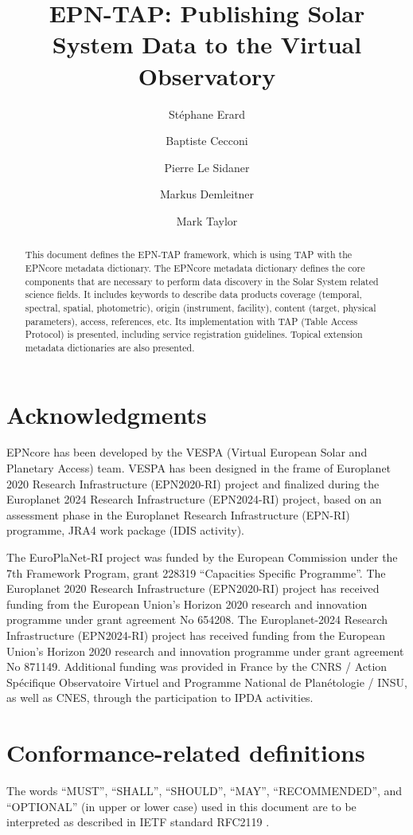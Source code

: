 \documentclass[11pt,a4paper]{ivoa}
\title{EPN-TAP: Publishing Solar System Data to the Virtual Observatory}
\author{St\'ephane Erard}
\author{Baptiste Cecconi}
\author{Pierre Le Sidaner}
\author{Markus Demleitner}
\author{Mark Taylor}
\begin{document}
\begin{abstract}
This document defines the EPN-TAP framework, which is using TAP with
the EPNcore metadata dictionary. The EPNcore metadata dictionary defines
the core components that are necessary to perform data discovery in the
Solar System related science fields. It includes keywords to describe
data products coverage (temporal, spectral, spatial, photometric), origin
(instrument, facility), content (target, physical parameters), access,
references, etc. Its implementation with TAP (Table Access Protocol) is
presented, including service registration guidelines. Topical extension
metadata dictionaries are also presented.
\end{abstract}


\section*{Acknowledgments}

EPNcore has been developed by the VESPA (Virtual European Solar
and Planetary Access) team.  VESPA has been designed in the frame of
Europlanet 2020 Research Infrastructure (EPN2020-RI) project and finalized
during the Europlanet 2024 Research Infrastructure (EPN2024-RI) project,
based on an assessment phase in the Europlanet Research Infrastructure
(EPN-RI) programme, JRA4 work package (IDIS activity).

The EuroPlaNet-RI project was funded by the European Commission under the
7th Framework Program, grant 228319 ``Capacities Specific Programme''.
The Europlanet 2020 Research Infrastructure (EPN2020-RI) project has
received funding from the European Union's Horizon 2020 research and
innovation programme under grant agreement No 654208.  The Europlanet-2024
Research Infrastructure (EPN2024-RI) project has received funding from
the European Union's Horizon 2020 research and innovation programme under
grant agreement No 871149.  Additional funding was provided in France by
the CNRS / Action Sp\'ecifique Observatoire Virtuel and Programme National
de Plan\'etologie / INSU, as well as CNES, through the participation to
IPDA activities.

\section*{Conformance-related definitions}

The words ``MUST'', ``SHALL'', ``SHOULD'', ``MAY'', ``RECOMMENDED'', and
``OPTIONAL'' (in upper or lower case) used in this document are to be
interpreted as described in IETF standard RFC2119 \citep{std:RFC2119}.
\end{document}
